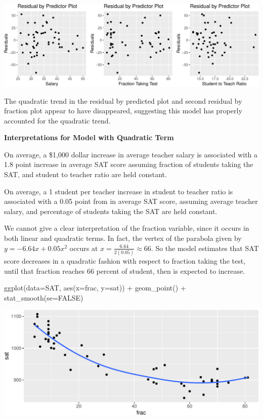 \documentclass[
  letterpaper,
  DIV=11,
  numbers=noendperiod]{scrreprt}
\newenvironment{Shaded}{\begin{snugshade}}{\end{snugshade}}
\newcommand{\AttributeTok}[1]{\textcolor[rgb]{0.40,0.45,0.13}{#1}}
\newcommand{\ConstantTok}[1]{\textcolor[rgb]{0.56,0.35,0.01}{#1}}
\newcommand{\FunctionTok}[1]{\textcolor[rgb]{0.28,0.35,0.67}{#1}}
\newcommand{\NormalTok}[1]{\textcolor[rgb]{0.00,0.23,0.31}{#1}}
\newcommand{\SpecialCharTok}[1]{\textcolor[rgb]{0.37,0.37,0.37}{#1}}
\begin{document}
\includegraphics{Ch5_files/figure-pdf/unnamed-chunk-47-1.pdf}

The quadratic trend in the residual by predicted plot and second
residual by fraction plot appear to have disappeared, suggesting this
model has properly accounted for the quadratic trend.

\textbf{Interpretations for Model with Quadratic Term}

On average, a \$1,000 dollar increase in average teacher salary is
associated with a 1.8 point increase in average SAT score assuming
fraction of students taking the SAT, and student to teacher ratio are
held constant.

On average, a 1 student per teacher increase in student to teacher ratio
is associated with a 0.05 point from in average SAT score, assuming
average teacher salary, and percentage of students taking the SAT are
held constant.

We cannot give a clear interpretation of the fraction variable, since it
occurs in both linear and quadratic terms. In fact, the vertex of the
parabola given by \(y=-6.64x + 0.05x^2\) occurs at
\(x=\frac{6.64}{2(0.05)}\approx 66\). So the model estimates that SAT
score decreases in a quadratic fashion with respect to fraction taking
the test, until that fraction reaches 66 percent of student, then is
expected to increase.

\begin{Shaded}
\begin{Highlighting}[]
\FunctionTok{ggplot}\NormalTok{(}\AttributeTok{data=}\NormalTok{SAT, }\FunctionTok{aes}\NormalTok{(}\AttributeTok{x=}\NormalTok{frac, }\AttributeTok{y=}\NormalTok{sat)) }\SpecialCharTok{+} \FunctionTok{geom\_point}\NormalTok{() }\SpecialCharTok{+} \FunctionTok{stat\_smooth}\NormalTok{(}\AttributeTok{se=}\ConstantTok{FALSE}\NormalTok{)}
\end{Highlighting}
\end{Shaded}

\includegraphics{Ch5_files/figure-pdf/unnamed-chunk-48-1.pdf}
\end{document}
